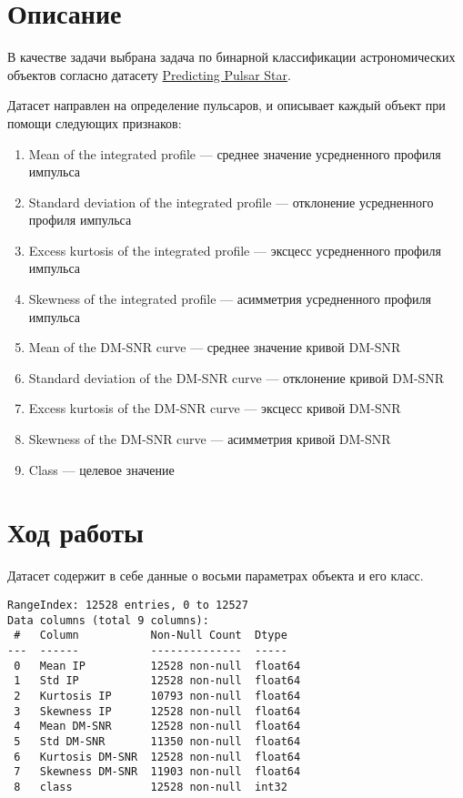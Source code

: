 \section{Описание}

В качестве задачи выбрана задача по бинарной классификации астрономических объектов согласно датасету \href{https://www.kaggle.com/datasets/colearninglounge/predicting-pulsar-starintermediate}{Predicting Pulsar Star}.

Датасет направлен на определение пульсаров, и описывает каждый объект при помощи следующих признаков:

\begin{enumerate}
	\item Mean of the integrated profile --- среднее значение усредненного профиля импульса
	\item Standard deviation of the integrated profile --- отклонение усредненного профиля импульса
	\item Excess kurtosis of the integrated profile --- эксцесс усредненного профиля импульса
	\item Skewness of the integrated profile --- асимметрия усредненного профиля импульса
	\item Mean of the DM-SNR curve --- среднее значение кривой DM-SNR
	\item Standard deviation of the DM-SNR curve --- отклонение кривой DM-SNR
	\item Excess kurtosis of the DM-SNR curve --- эксцесс кривой DM-SNR
	\item Skewness of the DM-SNR curve --- асимметрия кривой DM-SNR
	\item Class --- целевое значение
\end{enumerate}

\section{Ход работы}

Датасет содержит в себе данные о восьми параметрах объекта и его класс.

\begin{lstlisting}[frame=none, numbers=none]
RangeIndex: 12528 entries, 0 to 12527
Data columns (total 9 columns):
 #   Column           Non-Null Count  Dtype  
---  ------           --------------  -----  
 0   Mean IP          12528 non-null  float64
 1   Std IP           12528 non-null  float64
 2   Kurtosis IP      10793 non-null  float64
 3   Skewness IP      12528 non-null  float64
 4   Mean DM-SNR      12528 non-null  float64
 5   Std DM-SNR       11350 non-null  float64
 6   Kurtosis DM-SNR  12528 non-null  float64
 7   Skewness DM-SNR  11903 non-null  float64
 8   class            12528 non-null  int32
\end{lstlisting}

